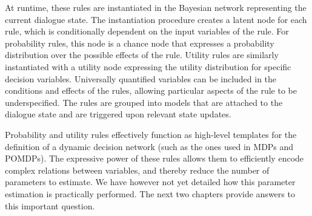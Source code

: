At runtime, these rules are instantiated in the Bayesian network representing the current dialogue state. The instantiation procedure creates a latent node for each rule, which is conditionally dependent on the input variables of the rule.  For probability rules, this node is a chance node that expresses a probability distribution over the possible effects of the rule. Utility rules are similarly instantiated with a utility node expressing the utility distribution for specific decision variables.  Universally quantified variables can be included in the conditions and effects of the rules, allowing particular aspects of the rule to be underspecified. The rules are grouped into models that are attached to the dialogue state and are triggered upon relevant state updates. 

Probability and utility rules effectively function as high-level templates for the definition of a dynamic decision network (such as the ones used in MDPs and POMDPs). The expressive power of these rules allows them to efficiently encode complex relations between variables, and thereby reduce the number of parameters to estimate.  We have however not yet detailed how this parameter estimation is practically performed. The next two chapters provide answers to this important question. 
